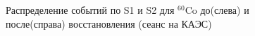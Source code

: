 \begin{figure}[ht]
  \begin{minipage}[ht]{0.49\linewidth}    
  \end{minipage}
  \hfill
  \begin{minipage}[ht]{0.49\linewidth}  
  \end{minipage}
  \caption{Распределение событий по S1 и S2 для $^{60}$Co до(слева) и после(справа) восстановления (сеанс на КАЭС)}
  \label{img:s1s2Co2022}  
\end{figure}

